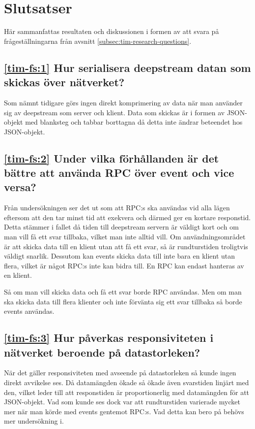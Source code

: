 \section{Slutsatser}
\label{sec:tim-conclusion}
Här sammanfattas resultaten och diskussionen i formen av att svara på frågeställningarna från avsnitt \ref{subsec:tim-research-questions}.

\subsection*{\ref{tim-fs:1} Hur serialisera deepstream datan som skickas över nätverket?}
Som nämnt tidigare görs ingen direkt komprimering av data när man använder sig av deepstream som server och klient. Data som skickas är i formen av JSON-objekt med blanksteg och tabbar borttagna då detta inte ändrar beteendet hos JSON-objekt.

\subsection*{\ref{tim-fs:2} Under vilka förhållanden är det bättre att använda RPC över event och vice versa?}
Från undersökningen ser det ut som att RPC:s ska användas vid alla lägen eftersom att den tar minst tid att exekvera och därmed ger en kortare responstid. Detta stämmer i fallet då tiden till deepstream servern är väldigt kort och om man vill få ett svar tillbaka, vilket man inte alltid vill. Om användningsområdet är att skicka data till en klient utan att få ett svar, så är rundturstiden troligtvis väldigt snarlik. Dessutom kan events skicka data till inte bara en klient utan flera, vilket är något RPC:s inte kan bidra till. En RPC kan endast hanteras av en klient.

Så om man vill skicka data och få ett svar borde RPC användas. Men om man ska skicka data till flera klienter och inte förvänta sig ett svar tillbaka så borde events användas.

\subsection*{\ref{tim-fs:3} Hur påverkas responsiviteten i nätverket beroende på datastorleken?}
När det gäller responsiviteten med avseende på datastorleken så kunde ingen direkt avvikelse ses. Då datamängden ökade så ökade även svarstiden linjärt med den, vilket leder till att responstiden är proportionerlig med datamängden för att JSON-objekt. Vad som kunde ses dock var att rundturstiden varierade mycket mer när man körde med events gentemot RPC:s. Vad detta kan bero på behövs mer undersökning i.
